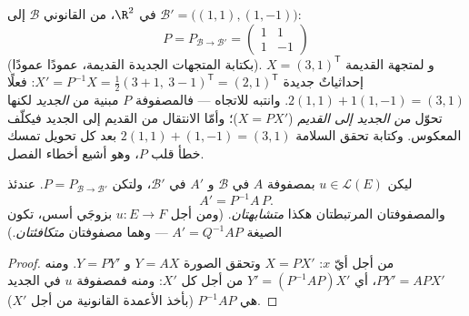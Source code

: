 \begin{example}
\label{ex:b1:matrices:changerun}
في $\R^2$، من القانوني $\mathcal B$ إلى $\mathcal B' =
\bigl((1,1), (1,-1)\bigr)$:
\[
P = P_{\mathcal B\to\mathcal B'} =
\begin{pmatrix} 1 & 1\\ 1 & -1 \end{pmatrix}
\]
(بكتابة المتجهات الجديدة  القديمة، عمودًا عمودًا). و
لمتجهة  القديمة $X = (3, 1)^{\mathsf T}$ إحداثياتٌ
جديدة $X' = P^{-1}X = \frac12(3 + 1,\ 3 - 1)^{\mathsf T} =
(2, 1)^{\mathsf T}$: فعلًا $2(1,1) + 1(1,-1) = (3,1)$. وانتبه
للاتجاه --- فالمصفوفة $P$ مبنية من  \emph{الجديد}
لكنها تحوّل \emph{من الجديد إلى القديم} ($X = PX'$)؛ وأمّا الانتقال
من القديم إلى الجديد فيكلّف المعكوس. وكتابة تحقق السلامة
$2(1,1) + (1,-1) = (3,1)$ بعد كل تحويل تمسك خطأ
قلب $P$، وهو أشيع أخطاء الفصل.
\end{example}

\begin{theorem}\label{thm:b1:matrices:conjugation}
ليكن $u \in \mathcal{L}(E)$ بمصفوفة $A$ في $\mathcal{B}$ و $A'$
في $\mathcal{B}'$، ولتكن $P = P_{\mathcal{B}\to\mathcal{B}'}$. عندئذ
\[
A' = P^{-1} A\, P .
\]
والمصفوفتان المرتبطتان هكذا \emph{متشابهتان}. (ومن أجل $u \colon E \to F$ بزوجَي أسس، تكون
الصيغة $A' = Q^{-1} A P$ --- وهما مصفوفتان
\emph{متكافئتان}.)
\end{theorem}

\begin{proof}
من أجل أيّ $x$: $X = PX'$ وتحقق الصورة $Y = AX$ و $Y = PY'$.
ومنه $PY' = APX'$، أي $Y' = (P^{-1}AP)X'$ من أجل كل $X'$: ومنه فمصفوفة
$u$ في  الجديد هي $P^{-1}AP$ (بأخذ الأعمدة القانونية
من أجل $X'$).
\end{proof}

